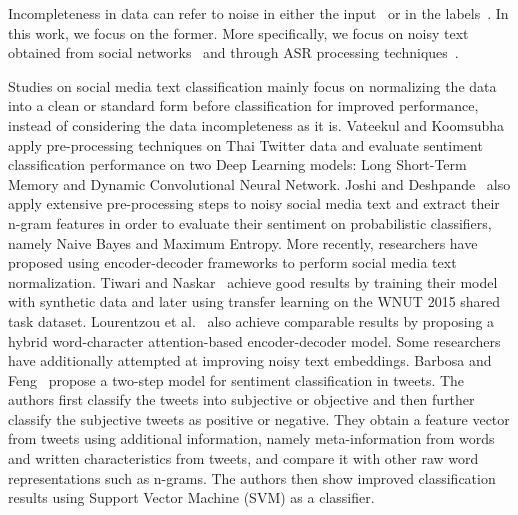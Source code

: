 \documentclass[review]{elsarticle}
\begin{document}
Incompleteness in data can refer to noise in either the input~\cite{vateekul2016study,tiwari2017normalization,joshi2018twitter,lourentzou2019adapting,vinciarelli2005noisy,agarwal2007much,shrestha2019using} or in the labels~\cite{nigam2000text,ramakrishnan2005model,tsuboi2008training}. In this work, we focus on the former. More specifically, we focus on noisy text~\cite{subramaniam2010noisy} obtained from social networks~\cite{vateekul2016study,tiwari2017normalization,joshi2018twitter,lourentzou2019adapting} and through ASR processing techniques~\cite{vinciarelli2005noisy,agarwal2007much,shrestha2019using}. 

Studies on social media text classification mainly focus on normalizing the data into a clean or standard form before classification for improved performance, instead of considering the data incompleteness as it is. Vateekul and Koomsubha~\cite{vateekul2016study} apply pre-processing techniques on Thai Twitter data and evaluate sentiment classification performance on two Deep Learning models: Long Short-Term Memory and Dynamic Convolutional Neural Network. Joshi and Deshpande~\cite{joshi2018twitter} also apply extensive pre-processing steps to noisy social media text and extract their n-gram features in order to evaluate their sentiment on probabilistic classifiers, namely Naive Bayes and Maximum Entropy. More recently, researchers have proposed using encoder-decoder frameworks to perform social media text normalization. Tiwari and Naskar~\cite{tiwari2017normalization} achieve good results by training their model with synthetic data and later using transfer learning on the WNUT 2015 shared task dataset. Lourentzou et al.~\cite{lourentzou2019adapting} also achieve comparable results by proposing a hybrid word-character attention-based encoder-decoder model. Some researchers have additionally attempted at improving noisy text embeddings. Barbosa and Feng~\cite{barbosa2010robust} propose a two-step model for sentiment classification in tweets. The authors first classify the tweets into subjective or objective and then further classify the subjective tweets as positive or negative. They obtain a feature vector from tweets using additional information, namely meta-information from words and written characteristics from tweets, and compare it with other raw word representations such as n-grams. The authors then show improved classification results using Support Vector Machine (SVM) as a classifier.
\end{document}
